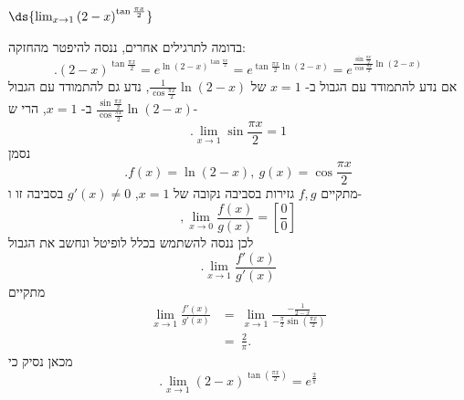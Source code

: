 \item $\ds{\lim_{x \to 1} \left( 2 - x \right)^{\tan\frac{\pi x}{2}}}$
\begin{solbox}
בדומה לתרגילים אחרים, ננסה להיפטר מהחזקה:
$$.\left( 2 - x \right)^{\tan\frac{\pi x}{2}}=e^{\ln\left( 2 - x \right)^{\tan\frac{\pi x}{2}}}=e^{\tan\frac{\pi x}{2}\ln\left( 2 - x \right)}=e^{\frac{\sin\frac{\pi x}{2}}{\cos\frac{\pi x}{2}}\ln\left( 2 - x \right)}$$
אם נדע להתמודד עם הגבול ב-
$x=1$
של
$\frac{1}{\cos\frac{\pi x}{2}}\ln\left( 2 - x \right)$,
נדע גם להתמודד עם הגבול
$\frac{\sin\frac{\pi x}{2}}{\cos\frac{\pi x}{2}}\ln\left( 2 - x \right)$
ב-
$x=1$,
הרי ש-
$$.\lim_{x\to1}\sin\frac{\pi x}{2}=1$$
נסמן
$$.f(x)=\ln\left( 2 - x \right),\ g(x)=\cos\frac{\pi x}{2}$$
מתקיים
$f,g$
גזירות בסביבה נקובה של
$x=1$,
$g'(x)\neq0$
בסביבה זו ו-
$$,\lim_{x\to0}\frac{f(x)}{g(x)}=\left[\frac{0}{0}\right]$$
לכן ננסה להשתמש בכלל לופיטל ונחשב את הגבול
$$.\lim_{x\to1}\frac{f'(x)}{g'(x)}$$
מתקיים
\begin{align*}
\lim_{x \to 1}\frac{f'(x)}{g'(x)}
&=\ \lim_{x\to 1}\frac{-\frac{1}{2-x}}{-\frac{\pi}{2}\sin\left(\frac{\pi x}{2}\right)}\\[4pt]
&=\ \frac{2}{\pi}.
\end{align*}
מכאן נסיק כי
$$.\lim_{x\to 1}(2-x)^{\tan\left(\frac{\pi x}{2}\right)}
=e^\frac{2}{\pi}$$
\end{solbox}

